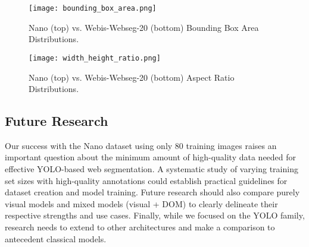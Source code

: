 \documentclass[conference]{IEEEtran}
\begin{document}
\begin{figure}[htbp]
\centerline{\texttt{[image: bounding\_box\_area.png]}}
\caption{Nano (top) vs. Webis-Webseg-20 (bottom) Bounding Box Area Distributions.}
\label{fig:bounding_boxes}
\end{figure}

\begin{figure}[htbp]
\centerline{\texttt{[image: width\_height\_ratio.png]}}
\caption{Nano (top) vs. Webis-Webseg-20 (bottom) Aspect Ratio Distributions.}
\label{fig:width_height_ratio} 
\end{figure}

\subsection{Future Research}

Our success with the Nano dataset using only 80 training images raises an important question about the minimum amount of high-quality data needed for effective YOLO-based web segmentation. A systematic study of varying training set sizes with high-quality annotations could establish practical guidelines for dataset creation and model training. Future research should also compare purely visual models and mixed models (visual + DOM) to clearly delineate their respective strengths and use cases. Finally, while we focused on the YOLO family, research needs to extend to other architectures and make a comparison to antecedent classical models.
\end{document}
